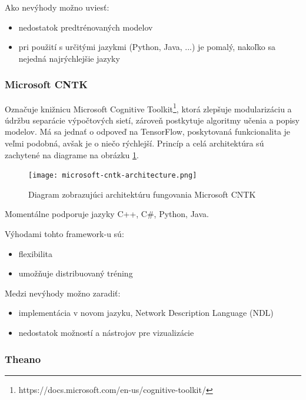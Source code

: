 Ako nevýhody možno uviesť:
\begin{itemize}
	\item nedostatok predtrénovaných modelov
	\item pri použití s určitými jazykmi (Python, Java, ...) je pomalý, nakoľko sa nejedná najrýchlejšie jazyky
\end{itemize}

\subsubsection{Microsoft CNTK}
Označuje knižnicu Microsoft Cognitive Toolkit\footnote{https://docs.microsoft.com/en-us/cognitive-toolkit/}, ktorá zlepšuje modularizáciu a údržbu separácie výpočtových sietí, zároveň postkytuje algoritmy učenia a popisy modelov. Má sa jednať o odpoveď na TensorFlow, poskytovaná funkcionalita je veľmi podobná, avšak je o niečo rýchlejší. Princíp a celá architektúra sú zachytené na diagrame na obrázku \ref{cntk_image}. 

\begin{figure}[H]
	\begin{center}\texttt{[image: microsoft-cntk-architecture.png]}
		\caption[Architektúra fungovania Microsoft CNTK]{
			Diagram zobrazujúci architektúru fungovania Microsoft CNTK\footnotemark
		}\label{cntk_image}
	\end{center}
\end{figure}

Momentálne podporuje jazyky C++, C\#, Python, Java.

Výhodami tohto framework-u sú:
\begin{itemize}
	\item flexibilita
	\item umožňuje distribuovaný tréning
\end{itemize}

Medzi nevýhody možno zaradiť:
\begin{itemize}
	\item implementácia v novom jazyku, Network Description Language (NDL)
	\item nedostatok možností a nástrojov pre vizualizácie
\end{itemize}

\subsubsection{Theano}

